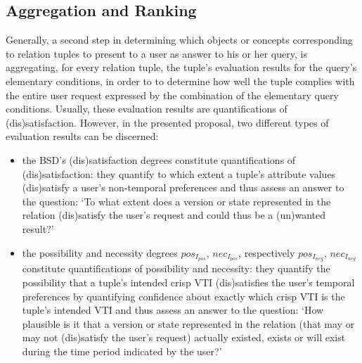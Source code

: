 \documentclass[runningheads,a4paper]{llncs}
\begin{document}
\subsection{Aggregation and Ranking}
Generally, a second step in determining which objects or concepts corresponding to relation tuples to present to a user as answer to his or her query, is aggregating, for every relation tuple, the tuple's evaluation results for the query's elementary conditions, in order to to determine how well the tuple complies with the entire user request expressed by the combination of the elementary query conditions. Usually, these evaluation results are quantifications of (dis)satisfaction. However, in the presented proposal, two different types of evaluation results can be discerned:

\begin{itemize}
	\item the BSD's (dis)satisfaction degrees constitute quantifications of (dis)satisfaction: they quantify to which extent a tuple's attribute values (dis)satisfy a user's non-temporal preferences and thus assess an answer to the question: `To what extent does a version or state represented in the relation (dis)satisfy the user's request and could thus be a (un)wanted result?'
	\item the possibility and necessity degrees $pos_{I_{pos}}$, $nec_{I_{pos}}$, respectively $pos_{I_{neg}}$, $nec_{I_{neg}}$ constitute quantifications of possibility and necessity: they quantify the possibility that a tuple's intended crisp VTI (dis)satisfies the user's temporal preferences by quantifying confidence about exactly which crisp VTI is the tuple's intended VTI and thus assess an answer to the question: `How plausible is it that a version or state represented in the relation (that may or may not (dis)satisfy the user's request) actually existed, exists or will exist during the time period indicated by the user?'
\end{itemize}
\end{document}
